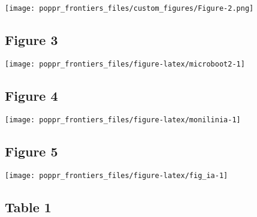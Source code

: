 \documentclass{frontiersSCNS} %
\newenvironment{CodeChunk}{}{}
\begin{document}
\texttt{[image: poppr\_frontiers\_files/custom\_figures/Figure-2.png]}

\subsection*{Figure 3}\label{figure-3}

\begin{CodeChunk}

\texttt{[image: poppr\_frontiers\_files/figure-latex/microboot2-1]} \end{CodeChunk}

\subsection*{Figure 4}\label{figure-4}

\begin{CodeChunk}

\texttt{[image: poppr\_frontiers\_files/figure-latex/monilinia-1]} \end{CodeChunk}

\subsection*{Figure 5}\label{figure-5}

\begin{CodeChunk}

\texttt{[image: poppr\_frontiers\_files/figure-latex/fig\_ia-1]} \end{CodeChunk}

\subsection*{Table 1}\label{table-1}
\end{document}
